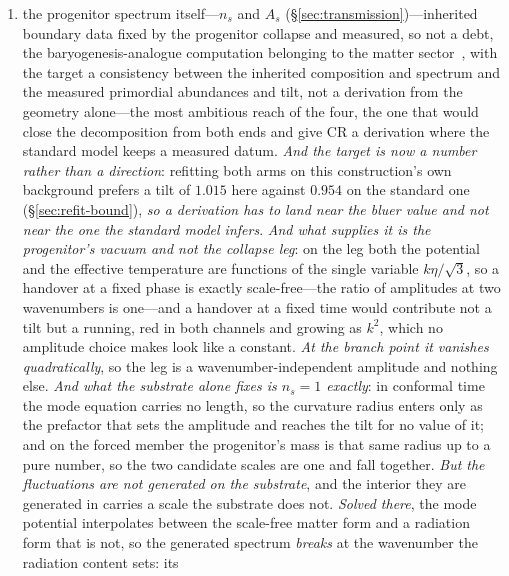 \documentclass[11pt,a4paper]{article}
\theoremstyle{plain}
\theoremstyle{definition}
\theoremstyle{remark}
\begin{document}
\begin{enumerate}
The exposed edges lie elsewhere---the acoustic contrast difference of the first item and the damping signature it carries;
\item the progenitor spectrum itself---$n_s$ and $A_s$ (\S\ref{sec:transmission})---inherited boundary data fixed by the progenitor collapse and measured, so not a debt, the baryogenesis-analogue computation belonging to the matter sector~\cite{JanzenOperator,JanzenRange}, with the target a consistency between the inherited composition and spectrum and the measured primordial abundances and tilt, not a derivation from the geometry alone---the most ambitious reach of the four, the one that would close the decomposition from both ends and give CR a derivation where the standard model keeps a measured datum. \emph{And the target is now a number rather than a direction}: refitting both arms on this construction's own background prefers a tilt of $1.015$ here against $0.954$ on the standard one (\S\ref{sec:refit-bound}), \emph{so a derivation has to land near the bluer value and not near the one the standard model infers}. \emph{And what supplies it is the progenitor's vacuum and not the collapse leg}: on the leg both the potential and the effective temperature are functions of the single variable $k\eta/\sqrt3$, so a handover at a fixed phase is exactly scale-free---the ratio of amplitudes at two wavenumbers is one---and a handover at a fixed time would contribute not a tilt but a running, red in both channels and growing as $k^{2}$, which no amplitude choice makes look like a constant. \emph{At the branch point it vanishes quadratically}, so the leg is a wavenumber-independent amplitude and
nothing else. \emph{And what the substrate alone fixes is $n_s=1$ exactly}: in conformal time the mode
equation carries no length, so the curvature radius enters only as the prefactor that sets the amplitude and
reaches the tilt for no value of it; and on the forced member the progenitor's mass is that same radius up to
a pure number, so the two candidate scales are one and fall together. \emph{But the fluctuations are not
generated on the substrate}, and the interior they are generated in carries a scale the substrate does not.
\emph{Solved there}, the mode potential interpolates between the scale-free matter form and a radiation form
that is not, so the generated spectrum \emph{breaks} at the wavenumber the radiation content sets: its

\end{enumerate}
\end{document}
